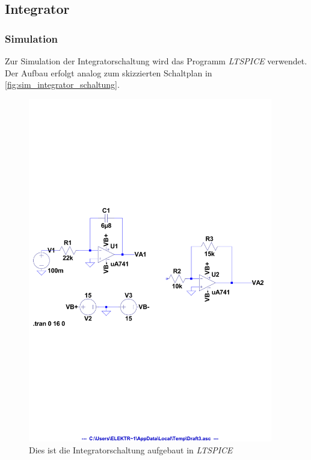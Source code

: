 \documentclass[12pt,english,ngerman]{scrartcl}
\begin{document}

\subsection{Integrator}

\subsubsection{Simulation}
Zur Simulation der Integratorschaltung wird das Programm
\textit{LTSPICE} verwendet. Der Aufbau erfolgt analog zum skizzierten
Schaltplan in \autoref{fig:sim_integrator_schaltung}. 

\begin{figure}[H]
  \centering
    \includegraphics[width=0.95\textwidth]{./figures/integrator/sim/umkehr_int/schalt_umkehr_100mv.pdf}
  \caption{Dies ist die Integratorschaltung aufgebaut in \textit{LTSPICE}}
  \label{fig:sim_integrator_schaltung}
\end{figure}
\end{document}
